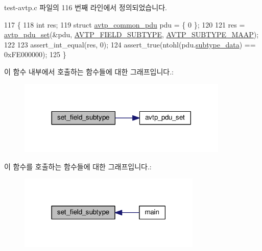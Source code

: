 test-\/avtp.\+c 파일의 116 번째 라인에서 정의되었습니다.


\begin{DoxyCode}
117 \{
118     \textcolor{keywordtype}{int} res;
119     \textcolor{keyword}{struct }\hyperlink{structavtp__common__pdu}{avtp\_common\_pdu} pdu = \{ 0 \};
120 
121     res = \hyperlink{avtp_8h_af79299e7e5721514f10efc9507660bc0}{avtp\_pdu\_set}(&pdu, \hyperlink{avtp_8h_ae8ac82f40d36ba8c7a71a451a1d7ddf0a9e663acceb0e8f7e7f4ac33bff00512c}{AVTP\_FIELD\_SUBTYPE}, 
      \hyperlink{avtp_8h_a928c9428ff3598096d6794424f66e23e}{AVTP\_SUBTYPE\_MAAP});
122 
123     assert\_int\_equal(res, 0);
124     assert\_true(ntohl(pdu.\hyperlink{structavtp__common__pdu_a3210e9f18fdc9c29cef7600c4d1e67e9}{subtype\_data}) == 0xFE000000);
125 \}
\end{DoxyCode}


이 함수 내부에서 호출하는 함수들에 대한 그래프입니다.\+:
\nopagebreak
\begin{figure}[H]
\begin{center}
\leavevmode
\includegraphics[width=284pt]{test-avtp_8c_a8c433313488777eac1a14d155e20fbbc_cgraph}
\end{center}
\end{figure}




이 함수를 호출하는 함수들에 대한 그래프입니다.\+:
\nopagebreak
\begin{figure}[H]
\begin{center}
\leavevmode
\includegraphics[width=247pt]{test-avtp_8c_a8c433313488777eac1a14d155e20fbbc_icgraph}
\end{center}
\end{figure}


